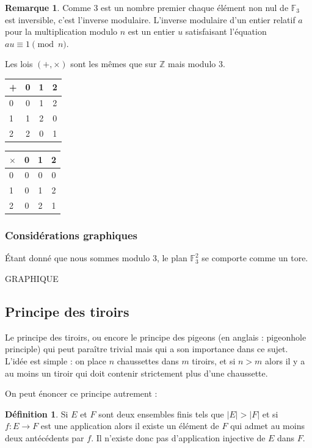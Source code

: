 \documentclass[a4paper,12pt,titlepage]{article}
\theoremstyle{plain}
\theoremstyle{definition}
\newtheorem{defi}{Définition}
\newtheorem{rmq}{Remarque}
\newcommand{\Ftrois}[1]{\mathbb{F}^#1_3}
\begin{document}
\begin{rmq}
Comme 3 est un nombre premier chaque élément non nul de $\mathbb{F}_3$ est inversible, c'est l'inverse modulaire. L'inverse modulaire d'un entier relatif $a$ pour la multiplication modulo $n$ est un entier $u$ satisfaisant l'équation $au \equiv 1 \pmod{n}$.
\end{rmq}

Les lois $(+,\times)$ sont les mêmes que sur $\mathbb{Z}$ mais modulo 3.
\begin{center}
\begin{tabular}{ l | c c c }
+ & 0 & 1 & 2 \\
\hline
0 & 0 & 1 & 2\\
1 & 1 & 2 & 0\\
2 & 2 & 0 & 1\\
\end{tabular}
\qquad
\begin{tabular}{ l | c c c }
$\times$ & 0 & 1 & 2 \\
\hline
0 & 0 & 0 & 0\\
1 & 0 & 1 & 2\\
2 & 0 & 2 & 1\\
\end{tabular}
\end{center}
\subsubsection{Considérations graphiques}
\'{E}tant donné que nous sommes modulo 3, le plan $\Ftrois{2}$ se comporte comme un tore.

GRAPHIQUE
\subsection{Principe des tiroirs}
Le principe des tiroirs, ou encore le principe des pigeons (en anglais : pigeonhole principle) qui peut paraître trivial mais qui a son importance dans ce sujet.
L’idée est simple : on place $n$ chaussettes dans $m$ tiroirs, et si $n>m$ alors il y a au moins un tiroir qui doit contenir strictement plus d’une chaussette.

On peut énoncer ce principe autrement : 
\begin{defi}
Si $E$ et $F$ sont deux ensembles finis tels que $|E|>|F|$ et si $f:E \to F$ est une application alors il existe un élément de $F$ qui admet au moins deux
antécédents par $f$. 
Il n’existe donc pas d’application injective de $E$ dans $F$.
\end{defi}
\end{document}
